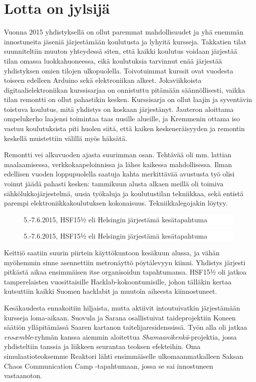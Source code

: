 \documentclass[a4paper]{memoir}
\newcommand{\varitys}{white}
\newlength{\aXa}
\newlength{\aXb}
\newcommand{\jana}[1]{
        \setlength{\aXa}{4cm}
        \setlength{\aXb}{0.4\textwidth}
   \ifodd\value{page}
        \begin{figure}\vspace{-7pt} \hspace{5pt} \colorbox{\varitys}{\parbox{\aXb}{   \textsf{{#1}}  }} \vspace{-7pt}\end{figure}
     \else
        \begin{figure}\vspace{-7pt}    \hspace{-5pt}  \colorbox{\varitys}{\parbox{\aXb}{   \textsf{{#1}} }} \vspace{-7pt}\end{figure}
     \fi
}
\begin{document}
\section*{Lotta on jylsijä}

Vuonna 2015 yhdistyksellä on ollut paremmat mahdollisuudet ja yhä enemmän innostuneita jäseniä järjestämään koulutusta ja lyhyitä kursseja. Takkatien tilat suunniteltiin muuton yhteydessä siten, että kaikki koulutus voidaan järjestää tilan omassa luokkahuoneessa, eikä koulutuksia tarvinnut enää järjestää yhdistyksen omien tilojen ulkopuolella. Toivotuimmat kurssit ovat vuodesta toiseen edelleen Arduino sekä elektroniikan alkeet. Jokaviikkoista digitaalielektroniikan kurssisarjaa on onnistuttu pitämään säännöllisesti, vaikka tilan remontti on ollut pahastikin kesken. Kurssisarja on ollut laajin ja syventävin toistuva koulutus, mitä yhdistys on koskaan järjestänyt. Jauteron aloittama ompelukerho laajensi toimintaa taas uusille alueille, ja Kremmenin ottama iso vastuu koulutuksista piti huolen siitä, että kaiken keskeneräisyyden ja remontin keskellä muistettiin välillä myös häksätä.

Remontti vei alkuvuoden ajasta suurimman osan. Tehtävää oli mm. lattian maalaamisessa, verkkokaapeloinnissa ja lähes kaikessa mahdollisessa. Ilman edellisen vuoden loppupuolella saatuja kahta merkittävää avustusta työ olisi voinut jäädä pahasti kesken: tammikuun alusta alkaen meillä oli toimiva sähkölukkojärjestelmä, uusia työkaluja ja koulutustilan tekniikkaa, sekä entistä parempi elektroniikkakoulutuksen kokonaisuus. Tekniikkalegojakin löytyy.

\jana{5.-7.6.2015, HSF15½ eli Helsingin järjestämä kesätapahtuma}

Keittiö saatiin suurin piirtein käyttökuntoon kesäkuun alussa, ja vähän myöhemmin sinne asennettiin metronäyttö pöytälevyyn kiinni. Yhdistys järjesti pitkästä aikaa ensimmäisen itse organisoidun tapahtumansa. HSF15½ oli jatkoa tamperelaisten vuosittaisille Hacklab-kokoontumisille, johon tälläkin kertaa kutsuttiin kaikki Suomen hacklabit ja muutoin aiheesta kiinnostuneet.

Kesäkaudesta ennakoitiin hiljaista, mutta aktiivit intoutuivatkin järjestämään kursseja loma-aikaan. Suovula ja Sarana osallistuivat taideprojektiin Koneen säätiön ylläpitämässä Saaren kartanon taitelijaresidenssissä. Työn alla oli jatkaa \textit{ensæmble}-ryhmän kanssa aiemmin aloitettua \textit{Shamaanikenkä}-projektia, jossa yhdisteltiin tanssia ja liikkeen seurantaa teoksen efekteihin. Oma simulaatioteoksemme Reaktori lähti ensimmäiselle ulkomaanmatkalleen Saksan Chaos Communication Camp -tapahtumaan, jossa se sai innostuneen vastaanoton.
\end{document}

